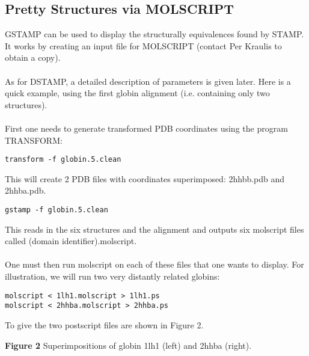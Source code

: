 \subsection{Pretty Structures via MOLSCRIPT}

GSTAMP can be used to display the structurally equivalences found by 
STAMP.  It works by creating an input file for MOLSCRIPT \cite{molscript} 
(contact Per Kraulis to obtain a copy).\\
\\
As for DSTAMP, a detailed description of parameters is given later. Here 
is a quick example, using the first globin alignment (i.e. containing only
two structures).\\
\\
First one needs to generate transformed PDB coordinates using the program 
TRANSFORM:

\begin{scriptsize}\begin{verbatim}
transform -f globin.5.clean
\end{verbatim} \end{scriptsize}

This will create 2 PDB files with coordinates superimposed: 2hhbb.pdb and 2hhba.pdb.\\

\begin{scriptsize}\begin{verbatim}
gstamp -f globin.5.clean
\end{verbatim} \end{scriptsize}

This reads in the six structures and the alignment and outputs six
molscript files called (domain identifier).molscript.\\
\\
One must then run molscript on each of these files that one wants to display.  For illustration,
we will run two very distantly related globins:

\begin{scriptsize}\begin{verbatim}
molscript < 1lh1.molscript > 1lh1.ps
molscript < 2hhba.molscript > 2hhba.ps
\end{verbatim} \end{scriptsize}

To give the two postscript files are shown in Figure 2.\\

\vspace*{3.5in}
\noindent
\begin{scriptsize}
    {\bf Figure 2} Superimpositions of globin 1lh1 (left) and 2hhba (right).\\
\end{scriptsize}


